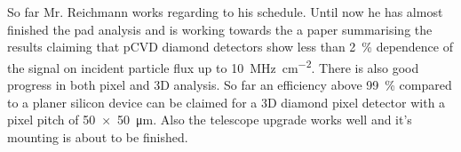 So far Mr. Reichmann works regarding to his schedule. Until now he has almost finished the pad analysis and is working towards the a paper summarising the results claiming that \ac{pCVD} diamond detectors show less than \SI{2}{\%} dependence of the signal on incident particle flux up to \SI{10}{\mega\hertz\per\centi\meter^2}. There is also good progress in both pixel and 3D analysis. So far an efficiency above \SI{99}{\%} compared to a planer silicon device can be claimed for a 3D diamond pixel detector with a pixel pitch of \SI{50x50}{\micro\meter}. Also the telescope upgrade works well and it's mounting is about to be finished. 
\parend